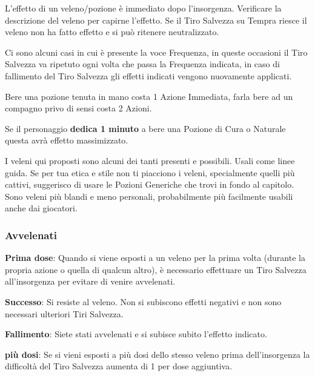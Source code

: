 \begin{multicols}{2}
L'effetto di un veleno/pozione è immediato dopo l'insorgenza. Verificare la descrizione del veleno per capirne l'effetto. Se il Tiro Salvezza su Tempra riesce il veleno non ha fatto effetto e si può ritenere neutralizzato.

Ci sono alcuni casi in cui è presente la voce Frequenza, in queste occasioni il Tiro Salvezza va ripetuto ogni volta che passa la Frequenza indicata, in caso di fallimento del Tiro Salvezza gli effetti indicati vengono nuovamente applicati.

Bere una pozione tenuta in mano costa 1 Azione Immediata, farla bere ad un compagno privo di sensi costa 2 Azioni.

Se il personaggio \textbf{dedica 1 minuto} a bere una Pozione di Cura o Naturale questa avrà effetto massimizzato.


\begin{changemargin}{0.3cm}{0.3cm}\begin{narratore}
I veleni qui proposti sono alcuni dei tanti presenti e possibili. Usali come linee guida. Se per tua etica e stile non ti piacciono i veleni, specialmente quelli più cattivi, suggerisco di usare le Pozioni Generiche che trovi in fondo al capitolo. Sono veleni più blandi e meno personali, probabilmente più facilmente usabili anche dai giocatori.
\end{narratore}\end{changemargin}

\subsubsection{Avvelenati}\label{avvelenato}

\textbf{Prima dose}: Quando si viene esposti a un veleno per la prima volta (durante la propria azione o quella di qualcun altro), è necessario effettuare un Tiro Salvezza all'insorgenza per evitare di venire avvelenati.

\textbf{Successo}: Si resiste al veleno. Non si subiscono effetti negativi e non sono necessari ulteriori Tiri Salvezza.

\textbf{Fallimento}: Siete stati avvelenati e si subisce subito l'effetto indicato.

\textbf{più dosi}: Se si vieni esposti a più dosi dello stesso veleno prima dell'insorgenza la difficoltà del Tiro Salvezza aumenta di 1 per dose aggiuntiva.


\end{multicols}
